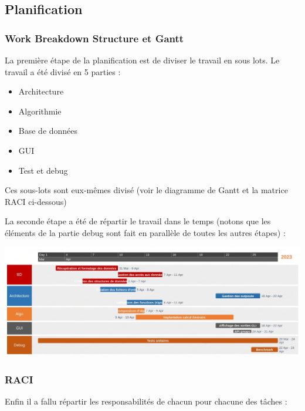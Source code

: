 \documentclass[a4paper, 12pt]{report}
\begin{document}
\subsection{Planification}

\subsubsection{Work Breakdown Structure et Gantt}

La première étape de la planification est de diviser le travail en sous lots. Le travail a été divisé en 5 parties :

\begin{itemize}
    \item Architecture
    \item Algorithmie
    \item Base de données
    \item GUI
    \item Test et debug
\end{itemize}
\bigskip

Ces sous-lots sont eux-mêmes divisé (voir le diagramme de Gantt et la matrice RACI ci-dessous)
\bigskip

La seconde étape a été de répartir le travail dans le temps (notons que les éléments de la partie debug sont fait en parallèle de toutes les autres étapes) :
\bigskip

\includegraphics[scale = 0.35]{./IMG/Gantt.png}
\clearpage

\subsubsection{RACI}

Enfin il a fallu répartir les responsabilités de chacun pour chacune des tâches :
\end{document}
